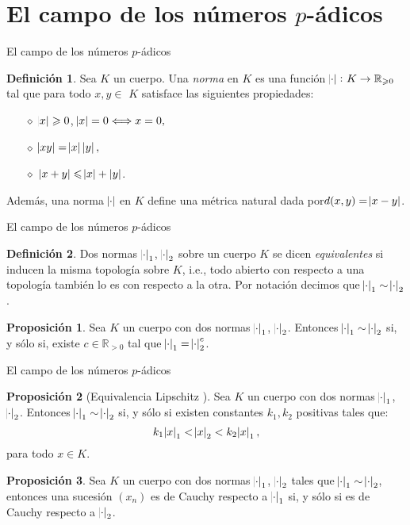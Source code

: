 \documentclass{beamer}
\newcommand{\bb}[1]{\mathbb{#1}}
\theoremstyle{definition}
\numberwithin{equation}{section}
\newcommand{\marine}[1]{\textcolor{defColor}{#1}}
\newcommand{\orangee}[1]{\textcolor{thColor}{#1}}
\newtheorem{df}{\marine{Definición}}
\newtheorem{pr}{\orangee{Proposición}}
\newcommand{\tit}[1]{\textit{#1}}
\renewcommand{\geq}{\geqslant}
\renewcommand{\leq}{\leqslant}
\newcommand{\R}{\mathbb{R}}
\begin{document}
\section{El campo de los números $p$-ádicos}
\begin{frame}{El campo de los números $p$-ádicos}
\begin{df}\label{pnorm}
	Sea $K$ un cuerpo. Una \textit{norma} en $K$ es una función
	$\abs{\cdot}\colon K \to \R_{\geq 0}$ tal que para todo $x,y\in$ $K$
	satisface las siguientes propiedades:
	
	\begin{enumerate}
		\item[$\diamond$] $\abs{x} \geq0$, $\abs{x}
		=0\Longleftrightarrow x=0,$
		
		\item[$\diamond$] $\abs{xy}  =\abs{x} \left\vert 
		y\right\vert ,$
		
		\item[$\diamond$] $\left\vert x+y\right\vert \leq\abs{x} +\left\vert y\right\vert$.
	\end{enumerate}
\end{df}
	Además, una norma $\abs{\cdot}$ en $K$ define una métrica natural dada por\linebreak ${d (x,y)=\abs{x-y}}$.
\end{frame}
\begin{frame}{El campo de los números $p$-ádicos}
\begin{df}
	Dos normas $\abs{\cdot}_1$, $\abs{\cdot}_2$ sobre un cuerpo $K$ se dicen \tit{equivalentes }si inducen la misma topología sobre $K$, i.e., todo abierto con respecto a una  topología también  lo es con respecto a la otra. Por notación decimos que $\abs{\cdot}_1\sim\abs{\cdot}_2$.
\end{df}

\begin{pr}\label{quiv_power}
	Sea $K$ un cuerpo con dos normas $\abs{\cdot}_1$, $\abs{\cdot}_2$. Entonces \linebreak$\abs{\cdot}_1\sim\abs{\cdot}_2$ si, y sólo si, existe $c\in\bb{R}_{>0}$ tal que $\abs{\cdot}_1=\abs{\cdot}_2^c$.
\end{pr}
\end{frame}
\begin{frame}{El campo de los números $p$-ádicos}
\begin{pr}
	[Equivalencia Lipschitz ]\label{lipeq}
	Sea $K$ un cuerpo con dos normas $\abs{\cdot}_1$, $\abs{\cdot}_2$. Entonces $\abs{\cdot}_1\sim\abs{\cdot}_2$ si, y sólo si existen constantes $k_1,k_2$ positivas tales que:
	$$k_1\abs{x}_1<\abs{x}_2< k_2\abs{x}_1,$$
	para todo $x\in K$.
\end{pr}
\begin{pr}
	\label{equiv_cauchy}
	Sea $K$ un cuerpo con dos normas $\abs{\cdot}_1$, $\abs{\cdot}_2$ tales que ${\abs{\cdot}_1\sim\abs{\cdot}_2}$, entonces una sucesión $ (x_n)$ es de Cauchy respecto a $\abs{\cdot}_1$ si, y sólo si es de Cauchy respecto a $\abs{\cdot}_2$.
\end{pr}
\end{frame}
\end{document}
